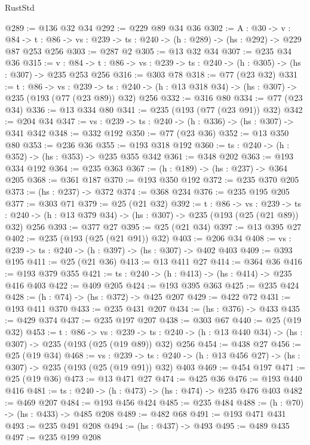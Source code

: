 \begin{lexlean}{RustStd}
\begin{coremodule}
{\begin{coremodule}
{{{{@289 := @136 @32 @34
@292 := @229 @89 @34 @36
@302 := {A : @30} ->
  {v : @84} ->
  {t : @86} -> {vs : @239} -> {ts : @240} -> (h : @289) -> (hs : @292) -> @229 @87 @253 @256
@303 := @287 @2
@305 := @13 @32 @34
@307 := @235 @34 @36
@315 := {v : @84} ->
  {t : @86} -> {vs : @239} -> {ts : @240} -> (h : @305) -> (hs : @307) -> @235 @253 @256
@316 := @303 @78
@318 := @77 (@23 @32)
@331 := {t : @86} ->
  {vs : @239} ->
  {ts : @240} -> (h : @13 @318 @34) -> (hs : @307) -> @235 (@193 (@77 (@23 @89)) @32) @256
@332 := @316 @80
@334 := @77 (@23 @34)
@336 := @13 @334 @80
@341 := @235 (@193 (@77 (@23 @91)) @32)
@342 := @204 @34
@347 := {vs : @239} -> {ts : @240} -> (h : @336) -> (hs : @307) -> @341 @342
@348 := @332 @192
@350 := @77 (@23 @36)
@352 := @13 @350 @80
@353 := @236 @36
@355 := @193 @318 @192
@360 := {ts : @240} -> (h : @352) -> (hs : @353) -> @235 @355 @342
@361 := @348 @202
@363 := @193 @334 @192
@364 := @235 @363
@367 := (h : @189) -> (hs : @237) -> @364 @205
@368 := @361 @187
@370 := @193 @350 @192
@372 := @235 @370 @205
@373 := (hs : @237) -> @372
@374 := @368 @234
@376 := @235 @195 @205
@377 := @303 @71
@379 := @25 (@21 @32)
@392 := {t : @86} ->
  {vs : @239} ->
  {ts : @240} -> (h : @13 @379 @34) -> (hs : @307) -> @235 (@193 (@25 (@21 @89)) @32) @256
@393 := @377 @27
@395 := @25 (@21 @34)
@397 := @13 @395 @27
@402 := @235 (@193 (@25 (@21 @91)) @32)
@403 := @206 @34
@408 := {vs : @239} -> {ts : @240} -> (h : @397) -> (hs : @307) -> @402 @403
@409 := @393 @195
@411 := @25 (@21 @36)
@413 := @13 @411 @27
@414 := @364 @36
@416 := @193 @379 @355
@421 := {ts : @240} -> (h : @413) -> (hs : @414) -> @235 @416 @403
@422 := @409 @205
@424 := @193 @395 @363
@425 := @235 @424
@428 := (h : @74) -> (hs : @372) -> @425 @207
@429 := @422 @72
@431 := @193 @411 @370
@433 := @235 @431 @207
@434 := (hs : @376) -> @433
@435 := @429 @374
@437 := @235 @197 @207
@438 := @303 @67
@440 := @25 (@19 @32)
@453 := {t : @86} ->
  {vs : @239} ->
  {ts : @240} -> (h : @13 @440 @34) -> (hs : @307) -> @235 (@193 (@25 (@19 @89)) @32) @256
@454 := @438 @27
@456 := @25 (@19 @34)
@468 := {vs : @239} ->
  {ts : @240} -> (h : @13 @456 @27) -> (hs : @307) -> @235 (@193 (@25 (@19 @91)) @32) @403
@469 := @454 @197
@471 := @25 (@19 @36)
@473 := @13 @471 @27
@474 := @425 @36
@476 := @193 @440 @416
@481 := {ts : @240} -> (h : @473) -> (hs : @474) -> @235 @476 @403
@482 := @469 @207
@484 := @193 @456 @424
@485 := @235 @484
@488 := (h : @70) -> (hs : @433) -> @485 @208
@489 := @482 @68
@491 := @193 @471 @431
@493 := @235 @491 @208
@494 := (hs : @437) -> @493
@495 := @489 @435
@497 := @235 @199 @208
}}}}
\end{coremodule}}
\end{coremodule}
\end{lexlean}
